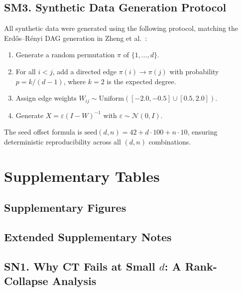 \documentclass[12pt,a4paper]{article}
\renewcommand{\thetable}{S\arabic{table}}
\begin{document}
\subsection*{SM3. Synthetic Data Generation Protocol}

All synthetic data were generated using the following protocol, matching the Erd\H{o}s--R\'{e}nyi DAG generation in Zheng et al.~\cite{zheng2018dags}:

\begin{enumerate}[leftmargin=*,itemsep=2pt]
    \item Generate a random permutation $\pi$ of $\{1,\ldots,d\}$.
    \item For all $i < j$, add a directed edge $\pi(i) \to \pi(j)$ with probability $p = k/(d-1)$, where $k=2$ is the expected degree.
    \item Assign edge weights $W_{ij} \sim \text{Uniform}([-2.0, -0.5] \cup [0.5, 2.0])$.
    \item Generate $X = \varepsilon (I - W)^{-1}$ with $\varepsilon \sim \mathcal{N}(0, I)$.
\end{enumerate}

The seed offset formula is $\text{seed}(d, n) = 42 + d \cdot 100 + n \cdot 10$, ensuring deterministic reproducibility across all $(d, n)$ combinations.


\section*{Supplementary Tables}



\subsection*{Supplementary Figures}
\label{sec:esm_figures}

\subsection*{Extended Supplementary Notes}

\subsection*{SN1. Why CT Fails at Small $d$: A Rank-Collapse Analysis}
\end{document}
